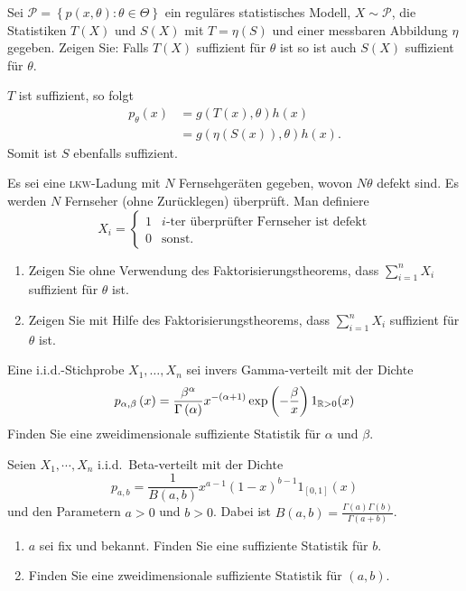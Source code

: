 Sei $\mathcal P = \left\{ p(x,\theta) : \theta\in\Theta \right\}$ ein reguläres
statistisches Modell, $X\sim \mathcal P$, die Statistiken $T(X)$ und $S(X)$ mit
$T=\eta(S)$ und einer messbaren Abbildung $\eta$ gegeben. Zeigen Sie: Falls
$T(X)$ suffizient für $\theta$ ist so ist auch $S(X)$ suffizient für $\theta$.

\solution $T$ ist suffizient, so folgt
\begin{align*}
    p_\theta(x) &= g(T(x), \theta) h(x) \\
    &= g(\eta(S(x)), \theta) h(x). 
\end{align*}
Somit ist $S$ ebenfalls suffizient. 



Es sei eine \textsc{lkw}-Ladung mit $N$ Fernsehgeräten gegeben, wovon $N
\theta$ defekt sind. Es werden $N$ Fernseher (ohne Zurücklegen) überprüft.  Man
definiere
\begin{equation*}
    X_i = \begin{cases}
        1 & \text{$i$-ter überprüfter Fernseher ist defekt} \\
        0 & \text{sonst}.
    \end{cases}
\end{equation*}
\begin{enumerate}
    \item Zeigen Sie ohne Verwendung des Faktorisierungstheorems, dass $\sum_{i=1}^{n} X_i$ 
        suffizient für $\theta$ ist. 
    \item Zeigen Sie mit Hilfe des Faktorisierungstheorems, dass $\sum_{i=1}^{n} X_i$ suffizient
        für $\theta$ ist.
\end{enumerate}


Eine i.i.d.-Stichprobe $X_1, \ldots, X_n$ sei invers Gamma-verteilt mit der
Dichte 
\begin{equation*}
    p_{\alpha, \beta}\left( x \right) = 
    \frac{\beta^\alpha}{ \Gamma\left( \alpha \right)} x^{-(\alpha+1)}\exp\left( -\frac{\beta}{x} \right)1_{\mathbb R>0}(x)
\end{equation*}
Finden Sie eine zweidimensionale suffiziente Statistik für $\alpha$ und $\beta$.


Seien $X_1, \cdots, X_n$ i.i.d.\ Beta-verteilt mit der Dichte
\begin{equation*}
    p_{a,b} = \frac{1}{B(a,b)} x^{a-1} (1-x)^{b-1} 1_{[0,1]}(x)
\end{equation*}
und den Parametern $a>0$ und $b>0$. Dabei ist $B(a,b)=
\frac{\Gamma(a)\Gamma(b)}{\Gamma(a+b)}$.
\begin{enumerate}
    \item $a$ sei fix und bekannt.  Finden Sie eine suffiziente Statistik für
        $b$.
    \item Finden Sie eine zweidimensionale suffiziente Statistik für $(a,b)$.
\end{enumerate}


